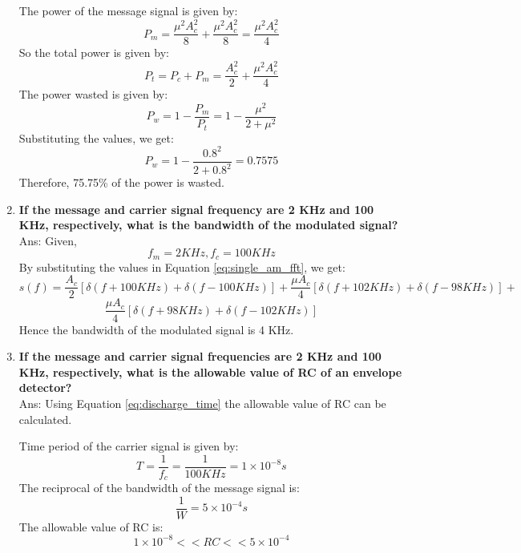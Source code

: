 \begin{enumerate}
    The power of the message signal is given by:
    \begin{equation}
        P_m = \frac{\mu^2A_c^2}{8} + \frac{\mu^2A_c^2}{8} = \frac{\mu^2A_c^2}{4}
    \end{equation}
    So the total power is given by:
    \begin{equation}
        P_t = P_c + P_m = \frac{A_c^2}{2} + \frac{\mu^2A_c^2}{4}
    \end{equation}
    The power wasted is given by:
    \begin{equation}
        P_w = 1 - \frac{P_m}{P_t} = 1 - \frac{\mu^2}{2 + \mu^2}
    \end{equation}
    Substituting the values, we get:
    \begin{equation}
        P_w = 1 - \frac{0.8^2}{2 + 0.8^2} = 0.7575
    \end{equation}
    Therefore, 75.75\% of the power is wasted.\\
    \item \textbf{If the message and carrier signal frequency are 2 KHz and 100 KHz, respectively, what is the bandwidth of the modulated signal?}\\
    Ans: Given,
    \begin{equation}
        f_m = 2 KHz, f_c = 100 KHz
    \end{equation}
    By substituting the values in Equation \ref{eq:single_am_fft}, we get:
    \[
        s(f) = \frac{A_c}{2}[\delta(f+100 KHz) + \delta(f-100 KHz)] + \frac{\mu A_c}{4}[\delta(f+102 KHz) + \delta(f-98 KHz)] +
    \]
    \begin{equation}
        \frac{\mu A_c}{4}[\delta(f+98 KHz) + \delta(f-102 KHz)]
    \end{equation}
    Hence the bandwidth of the modulated signal is 4 KHz.\\
    \item \textbf{If the message and carrier signal frequencies are 2 KHz and 100 KHz, respectively, what is the allowable value of RC of an envelope detector?}\\
    Ans: Using Equation \ref{eq:discharge_time} the allowable value of RC can be calculated.

    Time period of the carrier signal is given by:
    \begin{equation}
        T = \frac{1}{f_c} = \frac{1}{100 KHz} = 1 \times 10^{-8} s
    \end{equation}
    The reciprocal of the bandwidth of the message signal is:
    \begin{equation}
        \frac{1}{W} = 5 \times 10^{-4} s
    \end{equation}
    The allowable value of RC is:
    \begin{equation}
        1 \times 10^{-8} << RC << 5 \times 10^{-4}
    \end{equation}

\end{enumerate}
